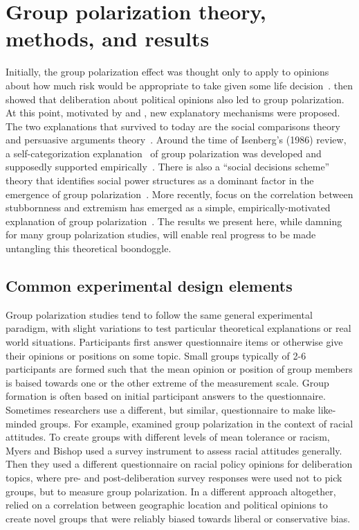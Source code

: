 \section{Group polarization theory, methods, and results}

Initially, the group polarization effect was thought only to apply to opinions about how much
risk would be appropriate to take given some life 
decision~\cite{Wallach1965,Teger1967,Stoner1968}.  then
showed that deliberation about political opinions also led to group 
polarization. At this point, motivated by  and
,
new explanatory mechanisms were proposed. The two explanations that survived to today 
are the social comparisons theory~\cite{Brown1974,Sanders1977,Myers1978} 
and persuasive arguments theory~\cite{Burnstein1973,Vinokur1974,Burnstein1975,Vinokur1978}. 
Around the time of Isenberg's
(1986) review, a self-categorization explanation~\cite{Turner1987} of
group polarization was developed and supposedly 
supported empirically~\cite{Turner1989,Abrams1990,Hogg1990,McGarty1992,Krizan2007}. 
There is also a
``social decisions scheme'' theory that identifies social power structures
as a dominant factor in the emergence of group polarization~\cite{Zuber1992,Friedkin1999a}. 
More recently, focus on the correlation between stubbornness and extremism has emerged as
a simple, empirically-motivated explanation of group 
polarization~\cite{Baldassarri2007,Mueller2018,Banisch2019,Turner2020}.
The results we present here, while damning for many group polarization studies,
will enable real progress to be made untangling this theoretical boondoggle.

\subsection{Common experimental design elements}

Group polarization studies tend to follow the same general experimental paradigm,
with slight variations to test particular theoretical explanations or 
real world situations. Participants first answer questionnaire
items or otherwise give their opinions or positions on some topic. Small groups
typically of 2-6 participants are formed such that the mean opinion or position
of group members is baised towards one or the other extreme of 
the measurement scale. Group formation is often based on initial participant
answers to the questionnaire. Sometimes researchers use a different, but similar, 
questionnaire to make like-minded groups. For example,  
examined group polarization in the context of racial attitudes. To create groups
with different levels of mean tolerance or racism, Myers and Bishop used a
survey instrument to assess racial attitudes generally. Then they used a different
questionnaire on racial policy opinions for deliberation topics, where pre- and post-deliberation 
survey responses were used not to pick groups, but to measure group polarization.
In a different approach altogether,  relied on a correlation between 
geographic location and political opinions to create novel groups that were
reliably biased towards liberal or conservative bias. 

